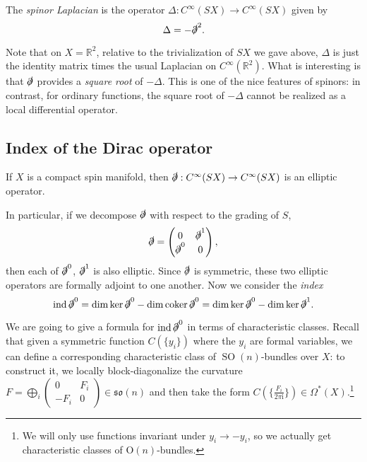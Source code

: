 \documentclass[12pt,letterpaper,reqno]{article}
\numberwithin{equation}{section}
\newcommand{\fso}{{\mathfrak {so}}}
\newcommand{\R}{\ensuremath{\mathbb R}}
\newcommand{\dirac}{\slashed{\partial}}
\newcommand{\I}{{\mathrm i}}
\newcommand{\ti}[1]{\textit{#1}}
\DeclareMathOperator{\ind}{ind}
\DeclareMathOperator{\coker}{coker}
\DeclareMathOperator{\SO}{SO}
\begin{document}
\begin{defn} The \ti{spinor Laplacian}
is the operator
$\Delta: C^\infty(SX) \to C^\infty(SX)$ given by
\begin{equation}
  \Delta = - \dirac^2.
\end{equation}
\end{defn}

Note that on $X = \R^2$, relative to the trivialization of $SX$ we gave above, 
$\Delta$ is just the identity matrix times the usual Laplacian on $C^\infty(\R^2)$.
What is interesting is that $\dirac$ provides a \ti{square root} of $-\Delta$. 
This is one of the nice features of spinors: in contrast, 
for ordinary functions, the square root of $-\Delta$
cannot be realized as a local differential operator.



\subsection{Index of the Dirac operator}

\begin{prop} If $X$ is a compact spin manifold, then $\dirac: C^\infty(SX) \to C^\infty(SX)$ 
is an elliptic operator. 
\end{prop}

In particular, if we decompose $\dirac$ with respect to the grading of $S$,
\begin{equation}
  \dirac = \begin{pmatrix} 0 & \dirac^1 \\ \dirac^0 & 0 \end{pmatrix},
\end{equation}
then each of $\dirac^0$, $\dirac^1$ is also elliptic.
Since $\dirac$ is symmetric, these two elliptic operators are formally 
adjoint to one another.
Now we consider the \ti{index}
\begin{equation}
  \ind \dirac^0 = \dim \ker \dirac^0 - \dim \coker \dirac^0 = \dim \ker \dirac^0 - \dim \ker \dirac^1.
\end{equation}

We are going to give a formula for $\ind \dirac^0$ in terms of characteristic
classes.
Recall that given a symmetric function $C(\{y_i\})$ where the $y_i$ are formal variables, 
we can define a corresponding characteristic class of $\SO(n)$-bundles over $X$: 
to construct it, we locally block-diagonalize the curvature 
$F = \bigoplus_i \begin{pmatrix} 0 & F_i \\ -F_i & 0 \end{pmatrix} \in \fso(n)$
and then take the form $C(\{\frac{F_i}{2\pi\I}\}) \in \Omega^*(X)$.\footnote{We 
will only use functions invariant under $y_i \to -y_i$, so we actually 
get characteristic classes of ${\mathrm O}(n)$-bundles.}
\end{document}
